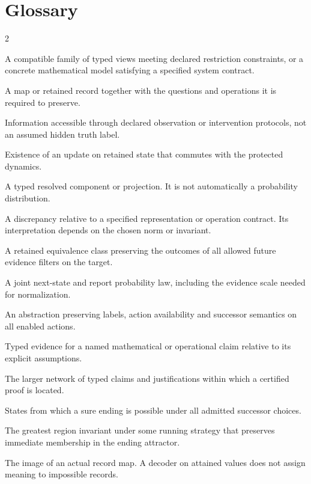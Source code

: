 \documentclass[11pt,oneside,openany]{book}
\numberwithin{equation}{section}
\begin{document}
\chapter{Glossary}
\begin{multicols}{2}
\small
\begin{description}[style=nextline,itemsep=3pt,parsep=0pt]
\item[Realization] A compatible family of typed views meeting declared restriction constraints, or a concrete mathematical model satisfying a specified system contract.
\item[Representation] A map or retained record together with the questions and operations it is required to preserve.
\item[Evidence] Information accessible through declared observation or intervention protocols, not an assumed hidden truth label.
\item[Predictive closure] Existence of an update on retained state that commutes with the protected dynamics.
\item[Packet] A typed resolved component or projection. It is not automatically a probability distribution.
\item[Residual] A discrepancy relative to a specified representation or operation contract. Its interpretation depends on the chosen norm or invariant.
\item[Correction signature] A retained equivalence class preserving the outcomes of all allowed future evidence filters on the target.
\item[Instrument] A joint next-state and report probability law, including the evidence scale needed for normalization.
\item[Legal-operation quotient] An abstraction preserving labels, action availability and successor semantics on all enabled actions.
\item[Certificate] Typed evidence for a named mathematical or operational claim relative to its explicit assumptions.
\item[Proof field] The larger network of typed claims and justifications within which a certified proof is located.
\item[Ending attractor] States from which a sure ending is possible under all admitted successor choices.
\item[Running kernel] The greatest region invariant under some running strategy that preserves immediate membership in the ending attractor.
\item[Attained domain] The image of an actual record map. A decoder on attained values does not assign meaning to impossible records.

\end{description}
\end{multicols}
\end{document}
